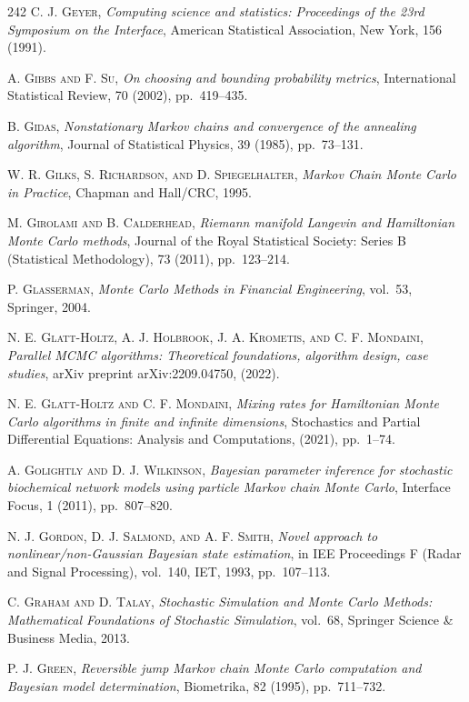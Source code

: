 \begin{thebibliography}{242}
\textsc{C. J. Geyer},
\textit{Computing science and statistics: Proceedings of the 23rd Symposium on the Interface},
American Statistical Association, New York, 156 (1991).

\textsc{A. Gibbs and F. Su},
\textit{On choosing and bounding probability metrics},
International Statistical Review, 70 (2002), pp.\ 419--435.

\textsc{B. Gidas},
\textit{Nonstationary Markov chains and convergence of the annealing algorithm},
Journal of Statistical Physics, 39 (1985), pp.\ 73--131.

\textsc{W. R. Gilks, S. Richardson, and D. Spiegelhalter},
\textit{Markov Chain Monte Carlo in Practice},
Chapman and Hall/CRC, 1995.

\textsc{M. Girolami and B. Calderhead},
\textit{Riemann manifold Langevin and Hamiltonian Monte Carlo methods},
Journal of the Royal Statistical Society: Series B (Statistical Methodology), 73 (2011), pp.\ 123--214.

\textsc{P. Glasserman},
\textit{Monte Carlo Methods in Financial Engineering},
vol.\ 53, Springer, 2004.

\textsc{N. E. Glatt-Holtz, A. J. Holbrook, J. A. Krometis, and C. F. Mondaini},
\textit{Parallel MCMC algorithms: Theoretical foundations, algorithm design, case studies},
arXiv preprint arXiv:2209.04750, (2022).

\textsc{N. E. Glatt-Holtz and C. F. Mondaini},
\textit{Mixing rates for Hamiltonian Monte Carlo algorithms in finite and infinite dimensions},
Stochastics and Partial Differential Equations: Analysis and Computations, (2021), pp.\ 1--74.

\textsc{A. Golightly and D. J. Wilkinson},
\textit{Bayesian parameter inference for stochastic biochemical network models using particle Markov chain Monte Carlo},
Interface Focus, 1 (2011), pp.\ 807--820.

\textsc{N. J. Gordon, D. J. Salmond, and A. F. Smith},
\textit{Novel approach to nonlinear/non-Gaussian Bayesian state estimation},
in IEE Proceedings F (Radar and Signal Processing), vol.\ 140, IET, 1993, pp.\ 107--113.

\textsc{C. Graham and D. Talay},
\textit{Stochastic Simulation and Monte Carlo Methods: Mathematical Foundations of Stochastic Simulation},
vol.\ 68, Springer Science \& Business Media, 2013.

\textsc{P. J. Green},
\textit{Reversible jump Markov chain Monte Carlo computation and Bayesian model determination},
Biometrika, 82 (1995), pp.\ 711--732.


\end{thebibliography}
